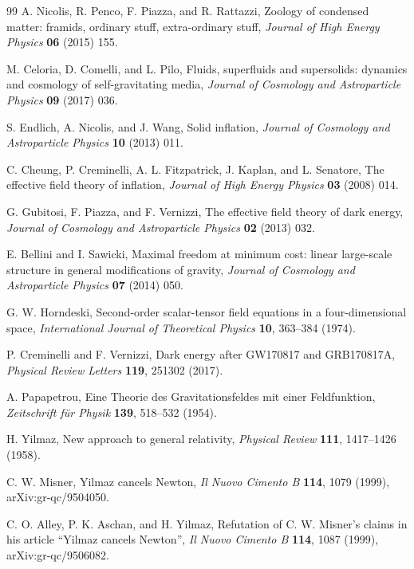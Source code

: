 \documentclass[12pt,a4paper]{article}
\begin{document}
\begin{thebibliography}{99}
A. Nicolis, R. Penco, F. Piazza, and R. Rattazzi, Zoology of condensed
matter: framids, ordinary stuff, extra-ordinary stuff, \textit{Journal of
High Energy Physics} \textbf{06} (2015) 155.

M. Celoria, D. Comelli, and L. Pilo, Fluids, superfluids and supersolids:
dynamics and cosmology of self-gravitating media, \textit{Journal of
Cosmology and Astroparticle Physics} \textbf{09} (2017) 036.

S. Endlich, A. Nicolis, and J. Wang, Solid inflation, \textit{Journal of
Cosmology and Astroparticle Physics} \textbf{10} (2013) 011.

C. Cheung, P. Creminelli, A. L. Fitzpatrick, J. Kaplan, and L. Senatore,
The effective field theory of inflation, \textit{Journal of High Energy
Physics} \textbf{03} (2008) 014.

G. Gubitosi, F. Piazza, and F. Vernizzi, The effective field theory of dark
energy, \textit{Journal of Cosmology and Astroparticle Physics}
\textbf{02} (2013) 032.

E. Bellini and I. Sawicki, Maximal freedom at minimum cost: linear
large-scale structure in general modifications of gravity, \textit{Journal
of Cosmology and Astroparticle Physics} \textbf{07} (2014) 050.

G. W. Horndeski, Second-order scalar-tensor field equations in a
four-dimensional space, \textit{International Journal of Theoretical
Physics} \textbf{10}, 363--384 (1974).

P. Creminelli and F. Vernizzi, Dark energy after GW170817 and GRB170817A,
\textit{Physical Review Letters} \textbf{119}, 251302 (2017).

A. Papapetrou, Eine Theorie des Gravitationsfeldes mit einer Feldfunktion,
\textit{Zeitschrift f\"ur Physik} \textbf{139}, 518--532 (1954).

H. Yilmaz, New approach to general relativity, \textit{Physical Review}
\textbf{111}, 1417--1426 (1958).

C. W. Misner, Yilmaz cancels Newton, \textit{Il Nuovo Cimento B}
\textbf{114}, 1079 (1999), arXiv:gr-qc/9504050.

C. O. Alley, P. K. Aschan, and H. Yilmaz, Refutation of C. W. Misner's
claims in his article ``Yilmaz cancels Newton'',
\textit{Il Nuovo Cimento B} \textbf{114}, 1087 (1999),
arXiv:gr-qc/9506082.


\end{thebibliography}
\end{document}
